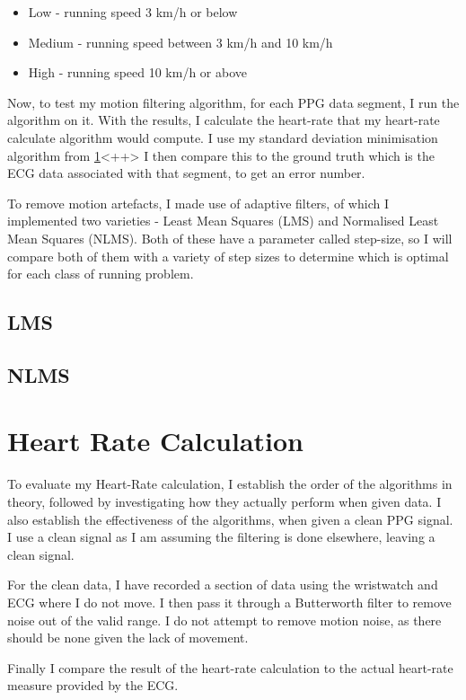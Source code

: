 \documentclass[12pt,a4paper,twoside,openright]{report}
\begin{document}
\begin{itemize}
	\item Low - running speed 3 km/h or below
	\item Medium - running speed between 3 km/h and 10 km/h
	\item High - running speed 10 km/h or above
\end{itemize} 

Now, to test my motion filtering algorithm, for each PPG data segment, I run
the algorithm on it. With the results, I calculate the heart-rate that my
heart-rate calculate algorithm would compute. 
I use my standard deviation minimisation algorithm from \ref{}<++>
I then compare this to the
ground truth which is the ECG data associated with that segment, to get an
error number.

To remove motion artefacts, I made use of adaptive filters, of which I
implemented two varieties - Least Mean Squares (LMS) and Normalised Least Mean
Squares (NLMS). Both of these have a parameter called step-size, so I will
compare both of them with a variety of step sizes to determine which is
optimal for each class of running problem.

\subsection{LMS}


\subsection{NLMS}


\section{Heart Rate Calculation}

To evaluate my Heart-Rate calculation, I establish the order of the algorithms
in theory, followed by investigating how they actually perform when given
data. I also establish the effectiveness of the algorithms, when given a clean
PPG signal. I use a clean signal as I am assuming the filtering is done
elsewhere, leaving a clean signal.

For the clean data, I have recorded a section of data using the wristwatch and ECG
where I do not move. I then pass it through a Butterworth filter to remove
noise out of the valid range. I do not attempt to remove motion noise, as
there should be none given the lack of movement.

Finally I compare the result of the heart-rate calculation to the actual
heart-rate measure provided by the ECG.
\end{document}
